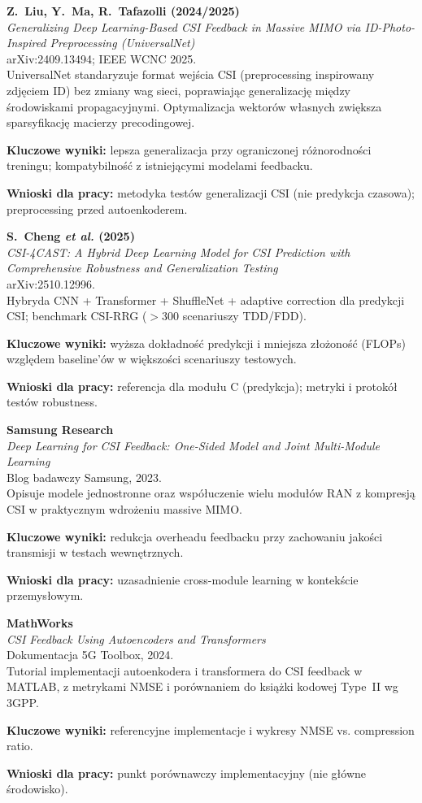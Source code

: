 \documentclass[12pt, a4paper]{article}
\newcommand{\bibentry}[4]{%
    \textbf{#1}\\
    \textit{#2}\\
    #3\\
    \vspace{0.3em}
    #4
    \vspace{0.8em}
}
\begin{document}
\bibentry{%
    Z.~Liu, Y.~Ma, R.~Tafazolli (2024/2025)}%
    {Generalizing Deep Learning-Based CSI Feedback in Massive MIMO via ID-Photo-Inspired Preprocessing (UniversalNet)}%
    {arXiv:2409.13494; IEEE WCNC 2025.}%
    {UniversalNet standaryzuje format wejścia CSI (preprocessing inspirowany zdjęciem ID) bez zmiany wag sieci, poprawiając generalizację między środowiskami propagacyjnymi. Optymalizacja wektorów własnych zwiększa sparsyfikację macierzy precodingowej.

    \textbf{Kluczowe wyniki:} lepsza generalizacja przy ograniczonej różnorodności treningu; kompatybilność z istniejącymi modelami feedbacku.

    \textbf{Wnioski dla pracy:} metodyka testów generalizacji CSI (nie predykcja czasowa); preprocessing przed autoenkoderem.}

\bibentry{%
    S.~Cheng \textit{et al.} (2025)}%
    {CSI-4CAST: A Hybrid Deep Learning Model for CSI Prediction with Comprehensive Robustness and Generalization Testing}%
    {arXiv:2510.12996.}%
    {Hybryda CNN + Transformer + ShuffleNet + adaptive correction dla predykcji CSI; benchmark CSI-RRG ($>$300 scenariuszy TDD/FDD).

    \textbf{Kluczowe wyniki:} wyższa dokładność predykcji i mniejsza złożoność (FLOPs) względem baseline'ów w większości scenariuszy testowych.

    \textbf{Wnioski dla pracy:} referencja dla modułu C (predykcja); metryki i protokół testów robustness.}

\bibentry{%
    Samsung Research}%
    {Deep Learning for CSI Feedback: One-Sided Model and Joint Multi-Module Learning}%
    {Blog badawczy Samsung, 2023.}%
    {Opisuje modele jednostronne oraz współuczenie wielu modułów RAN z kompresją CSI w praktycznym wdrożeniu massive MIMO.

    \textbf{Kluczowe wyniki:} redukcja overheadu feedbacku przy zachowaniu jakości transmisji w testach wewnętrznych.

    \textbf{Wnioski dla pracy:} uzasadnienie cross-module learning w kontekście przemysłowym.}

\bibentry{%
    MathWorks}%
    {CSI Feedback Using Autoencoders and Transformers}%
    {Dokumentacja 5G Toolbox, 2024.}%
    {Tutorial implementacji autoenkodera i transformera do CSI feedback w MATLAB, z metrykami NMSE i porównaniem do książki kodowej Type~II wg 3GPP.

    \textbf{Kluczowe wyniki:} referencyjne implementacje i wykresy NMSE vs. compression ratio.

    \textbf{Wnioski dla pracy:} punkt porównawczy implementacyjny (nie główne środowisko).}
\end{document}
